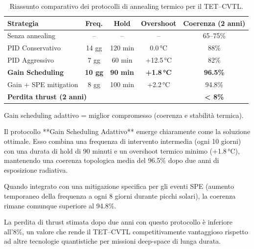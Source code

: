 \documentclass[11pt,a4paper]{article}
\theoremstyle{plain}
\theoremstyle{definition}
\begin{document}
\begin{table}[H]
\centering
\small
\renewcommand{\arraystretch}{1.2}

\begin{tabular}{l@{\quad}cccc}
\toprule
\rowcolor{teal!15}
\textbf{Strategia} & \textbf{Freq.} & \textbf{Hold} & \textbf{Overshoot} & \textbf{Coerenza (2 anni)} \\
\midrule
Senza annealing          & --      & --     & --          & 65--75\% \\
PID Conservativo         & 14 gg   & 120 min & 0.0\,°C    & 88\% \\
PID Aggressivo           & 7 gg    & 60 min  & +12.5\,°C  & 82\% \\
\textbf{Gain Scheduling} & \textbf{10 gg} & \textbf{90 min} & \textbf{+1.8\,°C} & \textbf{96.5\%} \\
Gain + SPE mitigation    & 8 gg    & 100 min & +2.2\,°C   & 94.8\% \\
\midrule
\multicolumn{4}{l}{\textbf{Perdita thrust (2 anni)}} & \textbf{< 8\%} \\
\bottomrule
\end{tabular}

\vspace{8pt}

{\footnotesize Gain scheduling adattivo = miglior compromesso (coerenza e stabilità termica).}

\caption{Riassunto comparativo dei protocolli di annealing termico per il TET--CVTL.}
\label{tab:annealing_radiation}
\end{table}


\vspace{0.2cm}

Il protocollo **Gain Scheduling Adattivo** emerge chiaramente come la soluzione ottimale. Esso combina una frequenza di intervento intermedia (ogni 10 giorni) con una durata di hold di 90 minuti e un overshoot termico minimo (+1.8\,°C), mantenendo una coerenza topologica media del 96.5\% dopo due anni di esposizione radiativa. 




Quando integrato con una mitigazione specifica per gli eventi SPE (aumento temporaneo della frequenza a ogni 8 giorni durante picchi solari), la coerenza rimane comunque superiore al 94.8\%.

\vspace{0.2cm}

La perdita di thrust stimata dopo due anni con questo protocollo è inferiore all'8\%, un valore che rende il TET--CVTL competitivamente vantaggioso rispetto ad altre tecnologie quantistiche per missioni deep-space di lunga durata.
\end{document}
